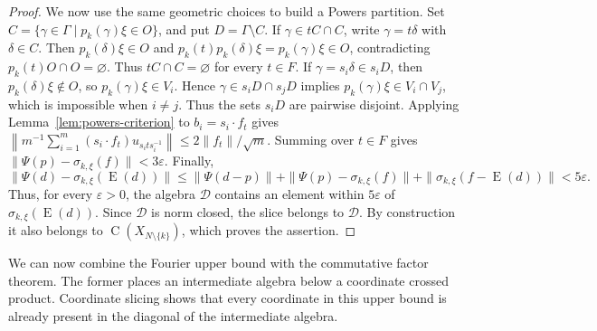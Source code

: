 \documentclass[11pt]{amsart}
\numberwithin{equation}{section}
\newcommand{\rC}{\operatorname{C}}
\newcommand{\rE}{\operatorname{E}}
\theoremstyle{definition}
\begin{document}
\begin{proof}
		We now use the same geometric choices to build a Powers partition. Set \(C=\{\gamma\in\Gamma\mid p_k(\gamma)\xi\in O\}\), and put \(D=\Gamma\setminus C\). If \(\gamma\in tC\cap C\), write \(\gamma=t\delta\) with \(\delta\in C\). Then \(p_k(\delta)\xi\in O\) and \(p_k(t)p_k(\delta)\xi=p_k(\gamma)\xi\in O\), contradicting \(p_k(t)O\cap O=\varnothing\). Thus \(tC\cap C=\varnothing\) for every \(t\in F\). If \(\gamma=s_i\delta\in s_iD\), then \(p_k(\delta)\xi\notin O\), so \(p_k(\gamma)\xi\in V_i\). Hence \(\gamma\in s_iD\cap s_jD\) implies \(p_k(\gamma)\xi\in V_i\cap V_j\), which is impossible when \(i\neq j\). Thus the sets \(s_iD\) are pairwise disjoint. Applying Lemma~\ref{lem:powers-criterion} to \(b_i=s_i\cdot f_t\) gives
		\(\left\|m^{-1}\sum_{i=1}^m(s_i\cdot f_t)u_{s_i t s_i^{-1}}\right\|
		\leq2\|f_t\|/\sqrt m\).
		Summing over \(t\in F\) gives \(\|\Psi(p)-\sigma_{k,\xi}(f)\|<3\varepsilon\). Finally,
		\[\|\Psi(d)-\sigma_{k,\xi}(\rE(d))\|
			\leq
			\|\Psi(d-p)\|+\|\Psi(p)-\sigma_{k,\xi}(f)\| +\|\sigma_{k,\xi}(f-\rE(d))\|
			<5\varepsilon.	\]
		Thus, for every \(\varepsilon>0\), the algebra \(\mathcal D\) contains an element within \(5\varepsilon\) of \(\sigma_{k,\xi}(\rE(d))\). Since \(\mathcal D\) is norm closed, the slice belongs to \(\mathcal D\). By construction it also belongs to \(\rC(X_{N\setminus\{k\}})\), which proves the assertion.
	\end{proof}
	
	We can now combine the Fourier upper bound with the commutative factor theorem. The former places an intermediate algebra below a coordinate crossed product. Coordinate slicing shows that every coordinate in this upper bound is already present in the diagonal of the intermediate algebra.
	
\end{document}
